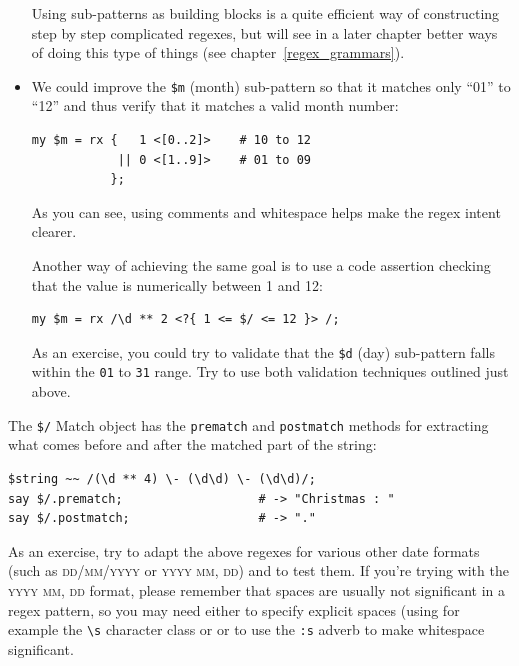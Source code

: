 \begin{itemize}
Using sub-patterns as building blocks is a quite efficient 
way of constructing step by step complicated regexes, but 
will see in a later chapter better ways of doing this 
type of things (see chapter~\ref{regex_grammars}).

\item We could improve the \verb'$m' (month) sub-pattern so 
that it matches only ``01'' to ``12'' and thus 
verify that it matches a valid month number:

\begin{verbatim}
my $m = rx {   1 <[0..2]>    # 10 to 12
            || 0 <[1..9]>    # 01 to 09
           };
\end{verbatim}
%

As you can see, using comments and whitespace helps 
make the regex intent clearer.

Another way of achieving the same goal is to use a 
code assertion checking that the value is numerically 
between 1 and 12:

\begin{verbatim}
my $m = rx /\d ** 2 <?{ 1 <= $/ <= 12 }> /;
\end{verbatim}

As an exercise, you could try to validate that the \verb'$d' 
(day) sub-pattern falls within the \verb'01' to \verb'31' 
range. Try to use both validation techniques outlined just 
above.

\end{itemize}

The \verb'$/' Match object has the {\tt prematch} and 
{\tt postmatch} methods for extracting what comes before 
and after the matched part of the string: 

\begin{verbatim}
$string ~~ /(\d ** 4) \- (\d\d) \- (\d\d)/;
say $/.prematch;                   # -> "Christmas : "
say $/.postmatch;                  # -> "."
\end{verbatim}
%

As an exercise, try to adapt the above regexes for various 
other date formats (such as \textsc{dd/mm/yyyy} or 
\textsc{yyyy mm, dd}) and to test them. If you're trying with 
the \textsc{yyyy mm, dd} format, please remember that spaces are 
usually not significant in a regex pattern, so you may need 
either to specify explicit spaces (using for example the \verb'\s' 
character class or or to use the \verb':s' adverb to make 
whitespace significant. 

